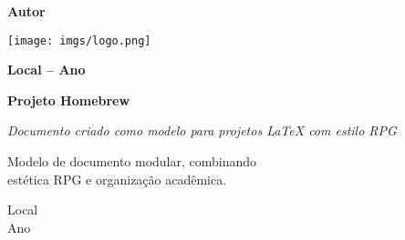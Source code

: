 
\begin{titlepage}
    \begin{center}
        \vspace*{2cm}
        
        
        \vfill
        
        \Large\textbf{Autor}
        
        \vspace{0.5cm}
        
        \texttt{[image: imgs/logo.png]}
        
        \vfill
        
        \large\textbf{Local -- Ano}
    \end{center}
\end{titlepage}

\cleardoublepage

\thispagestyle{empty}
\begin{center}
    \vspace*{2cm}
    
    {\Huge\bfseries Projeto Homebrew}
    
    \vspace{2cm}
    
    {\large\textit{Documento criado como modelo para projetos LaTeX com estilo RPG}}
    
    \vfill
    
    \begin{flushright}
        \begin{minipage}{8cm}
            \singlespacing
            Modelo de documento modular, combinando\\ 
            estética RPG e organização acadêmica.
        \end{minipage}
    \end{flushright}
    
    \vfill
    
    Local\\
    Ano
\end{center}

\cleardoublepage

\tableofcontents


